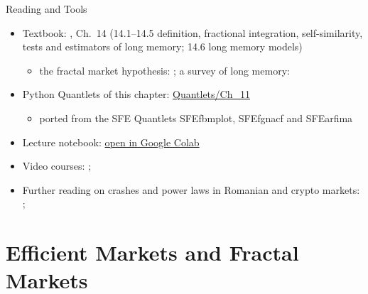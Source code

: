 \begin{frame}{Reading and Tools}
\itemsize{\small}
\begin{itemize}
    \item Textbook: , Ch.~14 (14.1--14.5 definition, fractional integration, self-similarity, tests and estimators of long memory; 14.6 long memory models)
    \begin{itemize}
        \item the fractal market hypothesis: ; a survey of long memory: 
    \end{itemize}
    \item Python Quantlets of this chapter: \href{https://github.com/danpele/SFM/tree/main/Quantlets/Ch_11}{Quantlets/Ch\_11}
    \begin{itemize}
        \item ported from the SFE Quantlets SFEfbmplot, SFEfgnacf and SFEarfima
    \end{itemize}
    \item Lecture notebook: \href{\colaburl{notebooks/EN/chapter11_lecture_notebook.ipynb}}{open in Google Colab}
    \item Video courses: ; 
    \item Further reading on crashes and power laws in Romanian and crypto markets: ; 
\end{itemize}
\end{frame}


\section{Efficient Markets and Fractal Markets}

